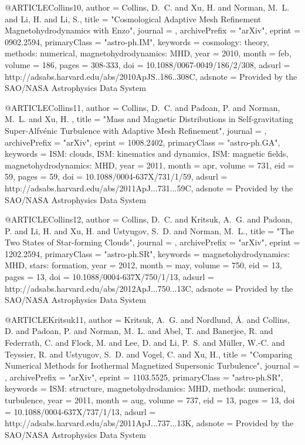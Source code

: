@ARTICLE{Collins10,
   author = {{Collins}, D.~C. and {Xu}, H. and {Norman}, M.~L. and {Li}, H. and 
	{Li}, S.},
    title = "{Cosmological Adaptive Mesh Refinement Magnetohydrodynamics with Enzo}",
  journal = {\apjs},
archivePrefix = "arXiv",
   eprint = {0902.2594},
 primaryClass = "astro-ph.IM",
 keywords = {cosmology: theory, methods: numerical, magnetohydrodynamics: MHD},
     year = 2010,
    month = feb,
   volume = 186,
    pages = {308-333},
      doi = {10.1088/0067-0049/186/2/308},
   adsurl = {http://adsabs.harvard.edu/abs/2010ApJS..186..308C},
  adsnote = {Provided by the SAO/NASA Astrophysics Data System}
}

@ARTICLE{Collins11,
   author = {{Collins}, D.~C. and {Padoan}, P. and {Norman}, M.~L. and {Xu}, H.
	},
    title = "{Mass and Magnetic Distributions in Self-gravitating Super-Alfv{\'e}nic Turbulence with Adaptive Mesh Refinement}",
  journal = {\apj},
archivePrefix = "arXiv",
   eprint = {1008.2402},
 primaryClass = "astro-ph.GA",
 keywords = {ISM: clouds, ISM: kinematics and dynamics, ISM: magnetic fields, magnetohydrodynamics: MHD},
     year = 2011,
    month = apr,
   volume = 731,
      eid = {59},
    pages = {59},
      doi = {10.1088/0004-637X/731/1/59},
   adsurl = {http://adsabs.harvard.edu/abs/2011ApJ...731...59C},
  adsnote = {Provided by the SAO/NASA Astrophysics Data System}
}

@ARTICLE{Collins12,
   author = {{Collins}, D.~C. and {Kritsuk}, A.~G. and {Padoan}, P. and {Li}, H. and 
	{Xu}, H. and {Ustyugov}, S.~D. and {Norman}, M.~L.},
    title = "{The Two States of Star-forming Clouds}",
  journal = {\apj},
archivePrefix = "arXiv",
   eprint = {1202.2594},
 primaryClass = "astro-ph.SR",
 keywords = {magnetohydrodynamics: MHD, stars: formation},
     year = 2012,
    month = may,
   volume = 750,
      eid = {13},
    pages = {13},
      doi = {10.1088/0004-637X/750/1/13},
   adsurl = {http://adsabs.harvard.edu/abs/2012ApJ...750...13C},
  adsnote = {Provided by the SAO/NASA Astrophysics Data System}
}

@ARTICLE{Kritsuk11,
   author = {{Kritsuk}, A.~G. and {Nordlund}, {\AA}. and {Collins}, D. and 
	{Padoan}, P. and {Norman}, M.~L. and {Abel}, T. and {Banerjee}, R. and 
	{Federrath}, C. and {Flock}, M. and {Lee}, D. and {Li}, P.~S. and 
	{M{\"u}ller}, W.-C. and {Teyssier}, R. and {Ustyugov}, S.~D. and 
	{Vogel}, C. and {Xu}, H.},
    title = "{Comparing Numerical Methods for Isothermal Magnetized Supersonic Turbulence}",
  journal = {\apj},
archivePrefix = "arXiv",
   eprint = {1103.5525},
 primaryClass = "astro-ph.SR",
 keywords = {ISM: structure, magnetohydrodamics: MHD, methods: numerical, turbulence},
     year = 2011,
    month = aug,
   volume = 737,
      eid = {13},
    pages = {13},
      doi = {10.1088/0004-637X/737/1/13},
   adsurl = {http://adsabs.harvard.edu/abs/2011ApJ...737...13K},
  adsnote = {Provided by the SAO/NASA Astrophysics Data System}
}

